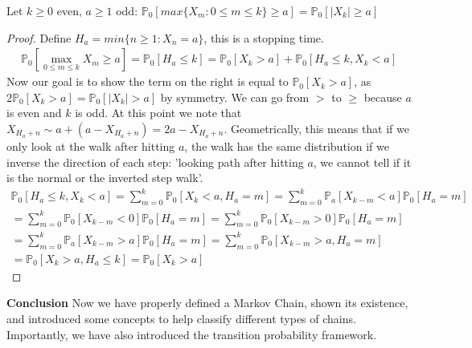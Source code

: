 \begin{prop}[]
	Let $k\geq 0$ even, $a\geq1$ odd: $\mathbb{P}_{0} \left[ max\{X_m: 0 \leq m \leq k \} \geq a \right] = \mathbb{P}_{0} \left[ |X_k|\geq a \right]  $
\end{prop}
\begin{proof}
	Define $H_a= min\{n \geq 1: X_n =a\}$, this is a stopping time.
	\begin{gather}
		\mathbb{P}_{0} \left[ \max_{0 \leq m \leq k}X_m \geq a \right] = \mathbb{P}_{0} \left[ H_a \leq k \right] = \mathbb{P}_{0} \left[ X_k > a \right]  + \mathbb{P}_{0} \left[ H_a \leq k, X_k < a \right] 
		\end{gather}
		Now our goal is to show the term on the right is equal to $\mathbb{P}_{0} \left[ X_k > a \right] $, as $2\mathbb{P}_{0} \left[ X_k > a \right] = \mathbb{P}_{0} \left[ |X_k| >a \right] $ by symmetry. We can go from $>$ to $\geq$ because $a$ is even and $k$ is odd. At this point we note that $X_{H_a +n} \sim a + (a-X_{H_a +n}) = 2a - X_{H_a +n}$. Geometrically, this means that if we only look at the walk after hitting $a$, the walk has the same distribution if we inverse the direction of each step: 'looking path after hitting $a$, we cannot tell if it is the normal or the inverted step walk'.
	\begin{gather}
		\mathbb{P}_{0} \left[ H_a \leq k, X_k < a \right] = \sum_{m=0}^{k} \mathbb{P}_{0} \left[ X_k < a, H_a = m \right] = \sum_{m=0}^{k} \mathbb{P}_{a} \left[ X_{k-m} < a \right] \mathbb{P}_{0} \left[ H_a = m \right]  \\
		= \sum_{m=0}^{k} \mathbb{P}_{0} \left[ X_{k-m}<0 \right] \mathbb{P}_{0} \left[ H_a = m \right] = \sum_{m=0}^{k} \mathbb{P}_{0} \left[ X_{k-m}>0 \right] \mathbb{P}_{0} \left[ H_a = m \right] \\
		= \sum_{m=0}^{k} \mathbb{P}_{a} \left[ X_{k-m}>a \right] \mathbb{P}_{0} \left[ H_a = m \right] = 
		 \sum_{m=0}^{k} \mathbb{P}_{0} \left[ X_{k-m}>a, H_a =m \right] \\
		= \mathbb{P}_{0} \left[ X_k >a, H_a \leq k \right] = \mathbb{P}_{0} \left[ X_k > a \right]  
	 \end{gather}
	
\end{proof}


\noindent
\textbf{Conclusion} Now we have properly defined a Markov Chain, shown its existence, and introduced some concepts to help classify different types of chains. Importantly, we have also introduced the transition probability framework. 


